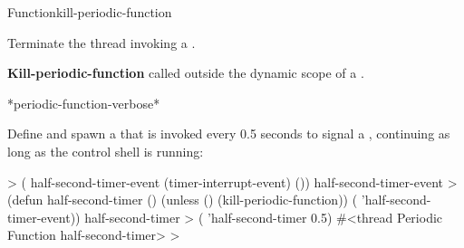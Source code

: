 \documentclass[10pt,twoside,english,pdftex]{article}
\begin{document}
\begin{functiondoc}{Function}{kill-periodic-function}{\noargs{}}
%
%

\fnsyntax

\fnpurpose Terminate the thread invoking a .

\fnpackage {}

\fnmodule {}

\fnerrors
\nothreads{}

\textbf{Kill-periodic-function} called outside the dynamic scope of a
.

\begin{alsos}{*periodic-function-verbose*}
\end{alsos}

%
%
%
%
%
\fnexample Define and spawn a  that is invoked every
0.5 seconds to signal a , continuing
as long as the control shell is running:
%
\W\supp
\begin{example}
  > ( half-second-timer-event (timer-interrupt-event)
      ())
  half-second-timer-event
  > (defun half-second-timer ()
      (unless ()
        (kill-periodic-function))
      ( 'half-second-timer-event))
  half-second-timer
  > ( 'half-second-timer 0.5)
  #<thread Periodic Function half-second-timer>
  >
\end{example}

\end{functiondoc}

\end{document}
